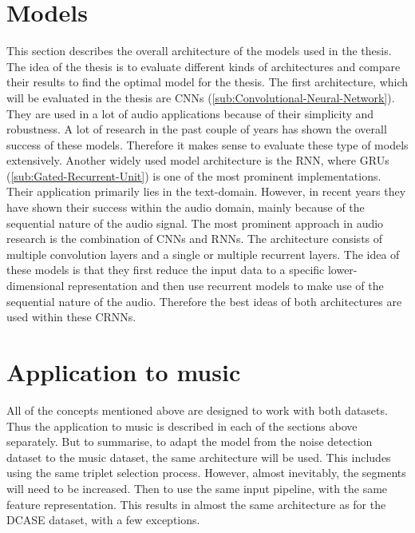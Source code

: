 \section{Models}
\label{sec:Models}
This section describes the overall architecture of the models used in the thesis. The idea of the thesis is to evaluate different kinds of architectures and compare their results to find the optimal model for the thesis.
\newline
\newline
The first architecture, which will be evaluated in the thesis are \glspl{CNN} (\ref{sub:Convolutional-Neural-Network}). They are used in a lot of audio applications because of their simplicity and robustness. A lot of research in the past couple of years has shown the overall success of these models. Therefore it makes sense to evaluate these type of models extensively. 
\newline
\newline
Another widely used model architecture is the \gls{RNN}, where \glspl{GRU} (\ref{sub:Gated-Recurrent-Unit}) is one of the most prominent implementations. Their application primarily lies in the text-domain. However, in recent years they have shown their success within the audio domain, mainly because of the sequential nature of the audio signal.
\newline
\newline
The most prominent approach in audio research is the combination of \glspl{CNN} and \glspl{RNN}. The architecture consists of multiple convolution layers and a single or multiple recurrent layers. The idea of these models is that they first reduce the input data to a specific lower-dimensional representation and then use recurrent models to make use of the sequential nature of the audio. Therefore the best ideas of both architectures are used within these \glspl{CRNN}.

\section{Application to music}
\label{sec:Application-Music}
All of the concepts mentioned above are designed to work with both datasets. Thus the application to music is described in each of the sections above separately. But to summarise, to adapt the model from the noise detection dataset to the music dataset, the same architecture will be used. This includes using the same triplet selection process. However, almost inevitably, the segments will need to be increased. Then to use the same input pipeline, with the same feature representation. This results in almost the same architecture as for the \gls{DCASE} dataset, with a few exceptions.

